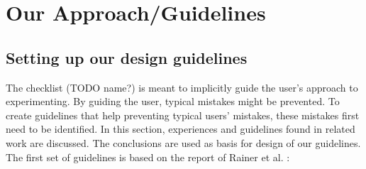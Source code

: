 
\newcommand{\obsrvQuote}[1]{\textit{``#1''} }

\section{Our Approach/Guidelines}

\subsection{Setting up our design guidelines}

The checklist (TODO name?) is meant to implicitly guide the user's approach to experimenting.
By guiding the user, typical mistakes might be prevented.
To create guidelines that help preventing typical users' mistakes, these mistakes first need to be identified.
In this section, experiences and guidelines found in related work are discussed.
The conclusions are used as basis for design of our guidelines.
The first set of guidelines is based on the report of Rainer et al. \cite{Rainer2006}:

